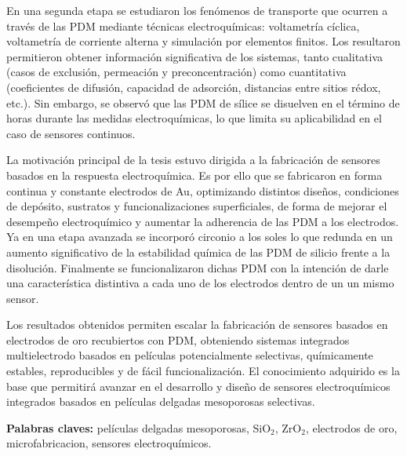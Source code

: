 En una segunda etapa se estudiaron los fenómenos de transporte que ocurren a través de las PDM mediante técnicas electroquímicas: voltametría cíclica, voltametría de corriente alterna y simulación por elementos finitos. Los resultaron permitieron obtener información significativa de los sistemas, tanto cualitativa (casos de exclusión, permeación y preconcentración) como cuantitativa (coeficientes de difusión, capacidad de adsorción, distancias entre sitios rédox, etc.). Sin embargo, se observó que las PDM de sílice se disuelven en el término de horas durante las medidas electroquímicas, lo que limita su aplicabilidad en el caso de sensores continuos.

La motivación principal de la tesis estuvo dirigida a la fabricación de sensores basados en la respuesta electroquímica. Es por ello que se fabricaron en forma continua y constante electrodos de Au, optimizando distintos diseños, condiciones de depósito, sustratos y funcionalizaciones superficiales, de forma de mejorar el desempeño electroquímico y aumentar la adherencia de las PDM a los electrodos. Ya en una etapa avanzada se incorporó circonio a los soles lo que redunda en un aumento significativo de la estabilidad química de las PDM de silicio frente a la disolución. Finalmente se funcionalizaron dichas PDM con la intención de darle una característica distintiva a cada uno de los electrodos dentro de un un mismo sensor.

Los resultados obtenidos permiten escalar la fabricación de sensores basados en electrodos de oro recubiertos con PDM, obteniendo sistemas integrados multielectrodo basados en películas potencialmente selectivas, químicamente estables, reproducibles y de fácil funcionalización. El conocimiento adquirido es la base que permitirá avanzar en el desarrollo y diseño de sensores electroquímicos integrados basados en películas delgadas mesoporosas selectivas. 
\vspace*{\fill}

\vfill

\noindent\textbf{Palabras claves:} películas delgadas mesoporosas, SiO$_2$, ZrO$_2$, electrodos de oro, microfabricacion, sensores electroquímicos.

\cleardoublepage
